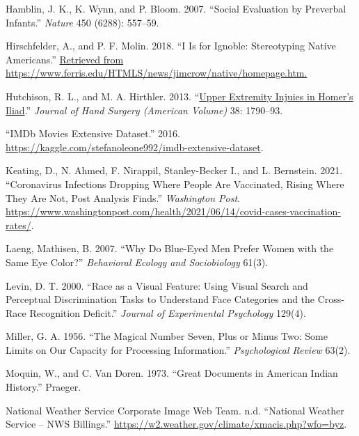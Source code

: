 \documentclass[
]{report}
\newlength{\cslhangindent}
\newlength{\cslentryspacingunit} %
\newenvironment{CSLReferences}[2] %
 {%
  \setlength{\parindent}{0pt}
  \ifodd #1
  \let\oldpar\par
  \def\par{\hangindent=\cslhangindent\oldpar}
  \fi
  \setlength{\parskip}{#2\cslentryspacingunit}
 }%
 {}
\begin{document}
\begin{CSLReferences}{1}{0}
\leavevmode{}%
Hamblin, J. K., K. Wynn, and P. Bloom. 2007. {``Social Evaluation by Preverbal Infants.''} \emph{Nature} 450 (6288): 557--59.

\leavevmode{}%
Hirschfelder, A., and P. F. Molin. 2018. {``I Is for Ignoble: Stereotyping Native Americans.''} \href{Retrieved\%20from\%20https://www.ferris.edu/HTMLS/news/jimcrow/native/homepage.htm.}{Retrieved from https://www.ferris.edu/HTMLS/news/jimcrow/native/homepage.htm.}

\leavevmode{}%
Hutchison, R. L., and M. A. Hirthler. 2013. {``\href{https://www.ncbi.nlm.nih.gov/pubmed/23932117}{Upper Extremity Injuies in Homer's Iliad}.''} \emph{Journal of Hand Surgery (American Volume)} 38: 1790--93.

\leavevmode{}%
{``{IMDb} Movies Extensive Dataset.''} 2016. \url{https://kaggle.com/stefanoleone992/imdb-extensive-dataset}.

\leavevmode{}%
Keating, D., N. Ahmed, F. Nirappil, Stanley-Becker I., and L. Bernstein. 2021. {``Coronavirus Infections Dropping Where People Are Vaccinated, Rising Where They Are Not, Post Analysis Finds.''} \emph{Washington Post}. \url{https://www.washingtonpost.com/health/2021/06/14/covid-cases-vaccination-rates/}.

\leavevmode{}%
Laeng, Mathisen, B. 2007. {``Why Do Blue-Eyed Men Prefer Women with the Same Eye Color?''} \emph{Behavioral Ecology and Sociobiology} 61(3).

\leavevmode{}%
Levin, D. T. 2000. {``Race as a Visual Feature: Using Visual Search and Perceptual Discrimination Tasks to Understand Face Categories and the Cross-Race Recognition Deficit.''} \emph{Journal of Experimental Psychology} 129(4).

\leavevmode{}%
Miller, G. A. 1956. {``The Magical Number Seven, Plus or Minus Two: Some Limits on Our Capacity for Processing Information.''} \emph{Psychological Review} 63(2).

\leavevmode{}%
Moquin, W., and C. Van Doren. 1973. {``Great Documents in American Indian History.''} Praeger.

\leavevmode{}%
National Weather Service Corporate Image Web Team. n.d. {``National Weather Service -- {NWS} Billings.''} \url{https://w2.weather.gov/climate/xmacis.php?wfo=byz}.


\end{CSLReferences}
\end{document}
